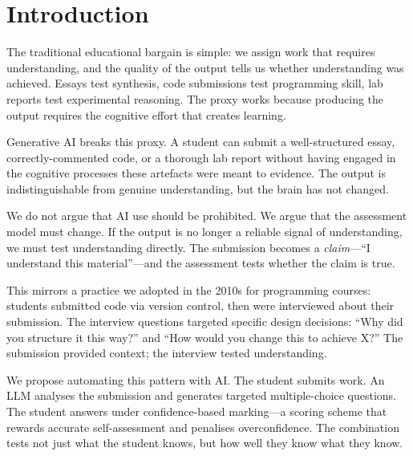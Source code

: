 \documentclass[sigconf]{acmart}
\begin{document}


\maketitle

\section{Introduction}

The traditional educational bargain is simple: we assign work that requires understanding, and the quality of the output tells us whether understanding was achieved. Essays test synthesis, code submissions test programming skill, lab reports test experimental reasoning. The proxy works because producing the output requires the cognitive effort that creates learning.

Generative AI breaks this proxy. A student can submit a well-structured essay, correctly-commented code, or a thorough lab report without having engaged in the cognitive processes these artefacts were meant to evidence. The output is indistinguishable from genuine understanding, but the brain has not changed.

We do not argue that AI use should be prohibited. We argue that the assessment model must change. If the output is no longer a reliable signal of understanding, we must test understanding directly. The submission becomes a \emph{claim}---``I understand this material''---and the assessment tests whether the claim is true.

This mirrors a practice we adopted in the 2010s for programming courses: students submitted code via version control, then were interviewed about their submission. The interview questions targeted specific design decisions: ``Why did you structure it this way?'' and ``How would you change this to achieve X?'' The submission provided context; the interview tested understanding.

We propose automating this pattern with AI. The student submits work. An LLM analyses the submission and generates targeted multiple-choice questions. The student answers under confidence-based marking---a scoring scheme that rewards accurate self-assessment and penalises overconfidence. The combination tests not just what the student knows, but how well they know what they know.
\end{document}

